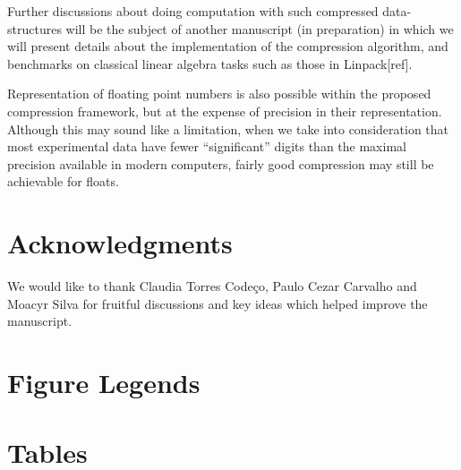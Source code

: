 \documentclass[10pt]{article}
\begin{document}
Further discussions about doing computation with such compressed data-structures will be the subject of another manuscript (in preparation) in which we will present details about the implementation of the compression algorithm, and benchmarks on classical linear algebra tasks such as those in Linpack[ref].

Representation of floating point numbers is also possible within the proposed compression framework, but at the expense of precision in their representation. Although this may sound like a limitation, when we take into consideration that most experimental data have fewer ``significant'' digits than the maximal precision available in modern computers, fairly good compression may still be achievable for floats.



\section*{Acknowledgments}
We would like to thank Claudia Torres Code\c{c}o, Paulo Cezar Carvalho and Moacyr Silva for fruitful discussions and key ideas which helped improve the manuscript.



\section*{Figure Legends}


\section*{Tables}
\end{document}

